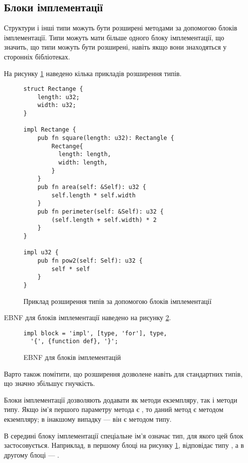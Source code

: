 \documentclass[main.tex]{subfiles}
\begin{document}
\FloatBarrier
\subsection{Блоки імплементації}
Структури і інші типи можуть бути розширені методами за допомогою блоків імплементації.
Типи можуть мати більше одного блоку імплементації, що значить, що типи можуть бути розширені, навіть якщо вони знаходяться у сторонніх бібліотеках.

На рисунку \ref{lang:impl-block} наведено кілька прикладів розширення типів.

\begin{figure}[h]
  \centering
  \begin{verbatim}
struct Rectange {
    length: u32;
    width: u32;
}

impl Rectange {
    pub fn square(length: u32): Rectangle {
        Rectange{
          length: length,
          width: length,
        }
    }
    pub fn area(self: &Self): u32 {
        self.length * self.width
    }
    pub fn perimeter(self: &Self): u32 {
        (self.length + self.width) * 2
    }
}

impl u32 {
    pub fn pow2(self: Self): u32 {
        self * self
    }
}
  \end{verbatim}
  \caption{Приклад розширення типів за допомогою блоків імплементації}
  \label{lang:impl-block}
\end{figure}

EBNF для блоків імплементації наведено на рисунку \ref{ebnf:impl}.

\begin{figure}[h]
  \centering
  \begin{verbatim}
impl block = 'impl', [type, 'for'], type,
  '{', {function def}, '}';
  \end{verbatim}
  \caption{EBNF для блоків імплементацій}
  \label{ebnf:impl}
\end{figure}

Варто також помітити, що розширення дозволене навіть для стандартних типів, що значно збільшує гнучкість.

Блоки імплементації дозволяють додавати як методи екземпляру, так і методи типу.
Якщо ім'я першого параметру метода є , то даний метод є методом екземпляру; в інакшому випадку --- він є методом типу.

В середині блоку імплементації спеціальне ім'я  означає тип, для якого цей блок застосовується. Наприклад, в першому блоці на рисунку \ref{lang:impl-block},  відповідає типу , а в другому блоці --- .
\end{document}

